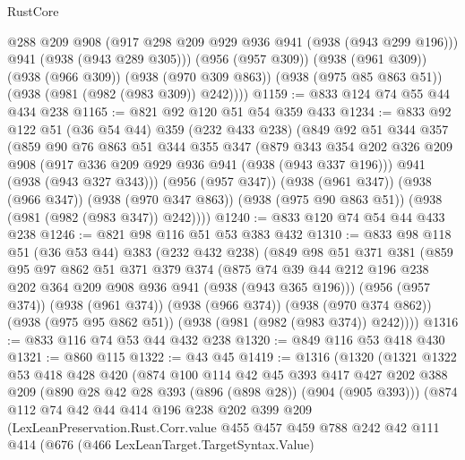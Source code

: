\begin{lexlean}{RustCore}
\begin{coremodule}
          @288
          @209
          @908
          (@917 @298 @209 @929 @936 @941 (@938 (@943 @299 @196)))
          @941
          (@938 (@943 @289 @305)))
        (@956 (@957 @309))
        (@938 (@961 @309))
        (@938 (@966 @309))
        (@938 (@970 @309 @863))
        (@938 (@975 @85 @863 @51))
        (@938 (@981 (@982 (@983 @309)) @242))))
@1159 := @833 @124 @74 @55 @44 @434 @238
@1165 := @821 @92 @120 @51 @54 @359 @433
@1234 := @833
    @92
    @122
    @51
    (@36 @54 @44)
    @359
    (@232 @433 @238)
    (@849
      @92
      @51
      @344
      @357
      (@859
        @90
        @76
        @863
        @51
        @344
        @355
        @347
        (@879
          @343
          @354
          @202
          @326
          @209
          @908
          (@917 @336 @209 @929 @936 @941 (@938 (@943 @337 @196)))
          @941
          (@938 (@943 @327 @343)))
        (@956 (@957 @347))
        (@938 (@961 @347))
        (@938 (@966 @347))
        (@938 (@970 @347 @863))
        (@938 (@975 @90 @863 @51))
        (@938 (@981 (@982 (@983 @347)) @242))))
@1240 := @833 @120 @74 @54 @44 @433 @238
@1246 := @821 @98 @116 @51 @53 @383 @432
@1310 := @833
    @98
    @118
    @51
    (@36 @53 @44)
    @383
    (@232 @432 @238)
    (@849
      @98
      @51
      @371
      @381
      (@859
        @95
        @97
        @862
        @51
        @371
        @379
        @374
        (@875 @74 @39 @44 @212 @196 @238 @202 @364 @209 @908 @936 @941 (@938 (@943 @365 @196)))
        (@956 (@957 @374))
        (@938 (@961 @374))
        (@938 (@966 @374))
        (@938 (@970 @374 @862))
        (@938 (@975 @95 @862 @51))
        (@938 (@981 (@982 (@983 @374)) @242))))
@1316 := @833 @116 @74 @53 @44 @432 @238
@1320 := @849 @116 @53 @418 @430
@1321 := @860 @115
@1322 := @43 @45
@1419 := @1316
    (@1320
      (@1321
        @1322
        @53
        @418
        @428
        @420
        (@874
          @100
          @114
          @42
          @45
          @393
          @417
          @427
          @202
          @388
          @209
          (@890 @28 @42 @28 @393 (@896 (@898 @28)) (@904 (@905 @393)))
          (@874
            @112
            @74
            @42
            @44
            @414
            @196
            @238
            @202
            @399
            @209
            (LexLeanPreservation.Rust.Corr.value
              @455
              @457
              @459
              @788
              @242
              @42
              @111
              @414
              (@676
                (@466 LexLeanTarget.TargetSyntax.Value)

\end{coremodule}
\end{lexlean}
